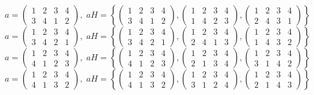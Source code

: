 \documentclass[a4paper,12pt]{article}
\begin{document}
\begin{itemize}
\[a = \begin{pmatrix} 1 & 2 & 3 & 4 \\ 3&4&1&2\end{pmatrix}, \; aH = \left\{\begin{pmatrix} 1 & 2 & 3 & 4 \\ 3&4&1&2\end{pmatrix}, \begin{pmatrix} 1 & 2 & 3 & 4 \\ 1&4&2&3\end{pmatrix}, \begin{pmatrix} 1 & 2 & 3 & 4 \\ 2&4&3&1\end{pmatrix} \right\}\]
\[a = \begin{pmatrix} 1 & 2 & 3 & 4 \\ 3&4&2&1\end{pmatrix}, \; aH = \left\{\begin{pmatrix} 1 & 2 & 3 & 4 \\ 3&4&2&1\end{pmatrix}, \begin{pmatrix} 1 & 2 & 3 & 4 \\ 2&4&1&3\end{pmatrix}, \begin{pmatrix} 1 & 2 & 3 & 4 \\ 1&4&3&2\end{pmatrix} \right\}\]
\[a = \begin{pmatrix} 1 & 2 & 3 & 4 \\ 4&1&2&3\end{pmatrix}, \; aH = \left\{\begin{pmatrix} 1 & 2 & 3 & 4 \\ 4&1&2&3\end{pmatrix}, \begin{pmatrix} 1 & 2 & 3 & 4 \\ 2&1&3&4\end{pmatrix}, \begin{pmatrix} 1 & 2 & 3 & 4 \\ 3&1&4&2\end{pmatrix} \right\}\]
\[a = \begin{pmatrix} 1 & 2 & 3 & 4 \\ 4&1&3&2\end{pmatrix}, \; aH = \left\{\begin{pmatrix} 1 & 2 & 3 & 4 \\ 4&1&3&2\end{pmatrix}, \begin{pmatrix} 1 & 2 & 3 & 4 \\ 3&1&2&4\end{pmatrix}, \begin{pmatrix} 1 & 2 & 3 & 4 \\ 2&1&4&3\end{pmatrix} \right\}\]

\end{itemize}
\end{document}
